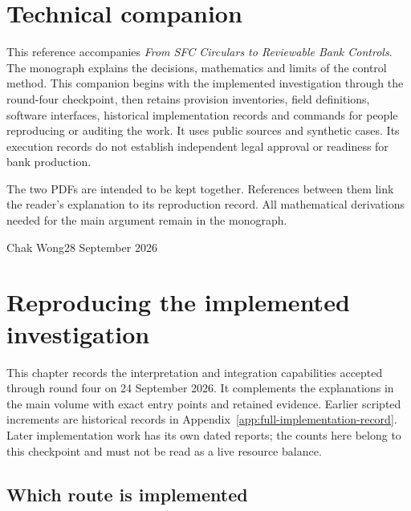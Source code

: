 \documentclass[12pt,a4paper,oneside,openany]{book}
\renewcommand{\chaptermark}[1]{\markboth{Chapter \thechapter}{}}
\begin{document}
\raggedbottom
\frontmatter
\chapter*{Technical companion}

This reference accompanies \emph{From SFC Circulars to Reviewable Bank Controls}.
The monograph explains the decisions, mathematics and limits of the control
method. This companion begins with the implemented investigation through the
round-four checkpoint, then retains provision inventories, field definitions,
software interfaces, historical implementation records and commands for people
reproducing or auditing the work. It uses public sources and synthetic cases.
Its execution records do not establish independent legal approval or readiness
for bank production.

The two PDFs are intended to be kept together. References between them link the
reader's explanation to its reproduction record. All mathematical derivations
needed for the main argument remain in the monograph.

Chak Wong\hfill 28 September 2026

\tableofcontents
\mainmatter
\appendix
{}
\renewcommand{\chaptermark}[1]{\markboth{Appendix \thechapter}{}}
\chapter{Reproducing the implemented investigation}
\label{app:current-interpretation}

This chapter records the interpretation and integration capabilities accepted
through round four on 24 September 2026. It complements the explanations in
the main volume with exact entry points and retained evidence. Earlier scripted
increments are historical records in Appendix~\ref{app:full-implementation-record}.
Later implementation work has its own dated reports; the counts here belong to
this checkpoint and must not be read as a live resource balance.

\section{Which route is implemented}
\end{document}
